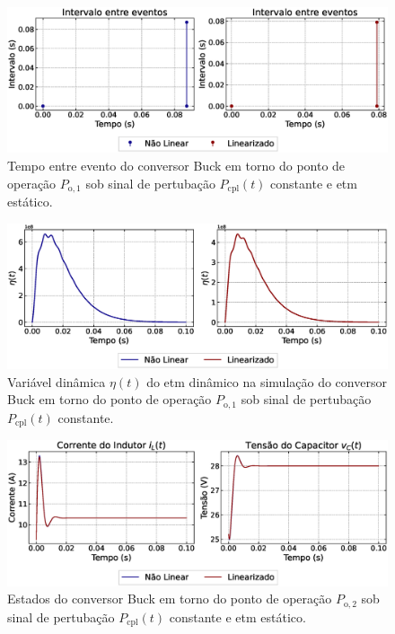 \begin{figure}[H]
  \centering
  \captionsetup{justification=centering}
  \includegraphics[width=1.\textwidth]{figuras/dynamic-etm/buck/sim1/op1/inter-event-times.eps}
  \caption{Tempo entre evento do conversor Buck em torno do ponto de operação $P_{\mathrm{o}, 1}$ sob sinal de pertubação $P_{\mathrm{cpl}}(t)$ constante e \acrshort{etm} estático.}
\end{figure}

\begin{figure}[H]
  \centering
  \captionsetup{justification=centering}
  \includegraphics[width=1.\textwidth]{figuras/dynamic-etm/buck/sim1/op1/eta.eps}
  \caption{Variável dinâmica $\eta(t)$ do \acrshort{etm} dinâmico na simulação do conversor Buck em torno do ponto de operação $P_{\mathrm{o}, 1}$ sob sinal de pertubação $P_{\mathrm{cpl}}(t)$ constante.}
\end{figure}


\begin{figure}[H]
  \centering
  \captionsetup{justification=centering}
  \includegraphics[width=1.\textwidth]{figuras/dynamic-etm/buck/sim1/op2/result.eps}
  \caption{Estados do conversor Buck em torno do ponto de operação $P_{\mathrm{o}, 2}$ sob sinal de pertubação $P_{\mathrm{cpl}}(t)$ constante e \acrshort{etm} estático.}
\end{figure}

